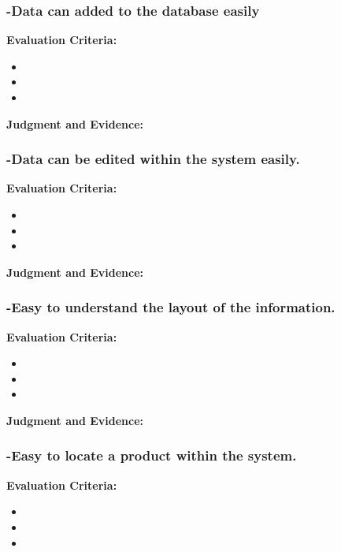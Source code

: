 \subsubsection{-Data can added to the database easily}
\textbf{Evaluation Criteria:} \newline
\begin{itemize}
\item{}
\item{}
\item{}
\end{itemize}

\textbf{Judgment and Evidence:} \newline





\subsubsection{-Data can be edited within the system easily.}
\textbf{Evaluation Criteria:} \newline
\begin{itemize}
\item{}
\item{}
\item{}
\end{itemize}

\textbf{Judgment and Evidence:} \newline





\subsubsection{-Easy to understand the layout of the information.}
\textbf{Evaluation Criteria:} \newline
\begin{itemize}
\item{}
\item{}
\item{}
\end{itemize}

\textbf{Judgment and Evidence:} \newline





\subsubsection{-Easy to locate a product within the system.}
\textbf{Evaluation Criteria:} \newline
\begin{itemize}
\item{}
\item{}
\item{}
\end{itemize}

